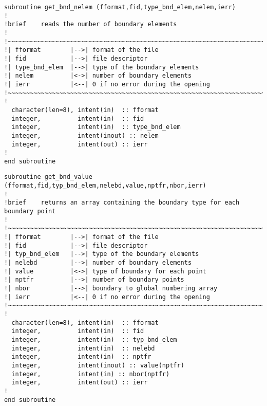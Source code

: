 %
\begin{lstlisting}
subroutine get_bnd_nelem (fformat,fid,type_bnd_elem,nelem,ierr)
!
!brief    reads the number of boundary elements
!
!~~~~~~~~~~~~~~~~~~~~~~~~~~~~~~~~~~~~~~~~~~~~~~~~~~~~~~~~~~~~~~~~~~~~~~~
!| fformat        |-->| format of the file
!| fid            |-->| file descriptor
!| type_bnd_elem  |-->| type of the boundary elements
!| nelem          |<->| number of boundary elements
!| ierr           |<--| 0 if no error during the opening
!~~~~~~~~~~~~~~~~~~~~~~~~~~~~~~~~~~~~~~~~~~~~~~~~~~~~~~~~~~~~~~~~~~~~~~~
!
  character(len=8), intent(in)  :: fformat
  integer,          intent(in)  :: fid
  integer,          intent(in)  :: type_bnd_elem
  integer,          intent(inout) :: nelem
  integer,          intent(out) :: ierr
!
end subroutine
\end{lstlisting}
%
\begin{lstlisting}
subroutine get_bnd_value (fformat,fid,typ_bnd_elem,nelebd,value,nptfr,nbor,ierr)
!
!brief    returns an array containing the boundary type for each boundary point
!
!~~~~~~~~~~~~~~~~~~~~~~~~~~~~~~~~~~~~~~~~~~~~~~~~~~~~~~~~~~~~~~~~~~~~~~~
!| fformat        |-->| format of the file
!| fid            |-->| file descriptor
!| typ_bnd_elem   |-->| type of the boundary elements
!| nelebd         |-->| number of boundary elements
!| value          |<->| type of boundary for each point
!| nptfr          |-->| number of boundary points
!| nbor           |-->| boundary to global numbering array
!| ierr           |<--| 0 if no error during the opening
!~~~~~~~~~~~~~~~~~~~~~~~~~~~~~~~~~~~~~~~~~~~~~~~~~~~~~~~~~~~~~~~~~~~~~~~
!
  character(len=8), intent(in)  :: fformat
  integer,          intent(in)  :: fid
  integer,          intent(in)  :: typ_bnd_elem
  integer,          intent(in)  :: nelebd
  integer,          intent(in)  :: nptfr
  integer,          intent(inout) :: value(nptfr)
  integer,          intent(in) :: nbor(nptfr)
  integer,          intent(out) :: ierr
!
end subroutine
\end{lstlisting}
%
